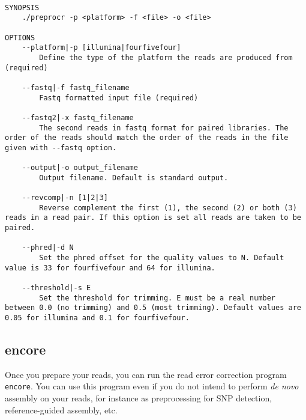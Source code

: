 \documentclass[12pt,a4paper]{report}
\begin{document}
\begin{lstlisting}

SYNOPSIS
    ./preprocr -p <platform> -f <file> -o <file> 

OPTIONS 
    --platform|-p [illumina|fourfivefour] 
        Define the type of the platform the reads are produced from (required) 

    --fastq|-f fastq_filename 
        Fastq formatted input file (required) 

    --fastq2|-x fastq_filename 
        The second reads in fastq format for paired libraries. The order of the reads should match the order of the reads in the file given with --fastq option. 

    --output|-o output_filename 
        Output filename. Default is standard output. 

    --revcomp|-n [1|2|3] 
        Reverse complement the first (1), the second (2) or both (3) reads in a read pair. If this option is set all reads are taken to be paired. 

    --phred|-d N 
        Set the phred offset for the quality values to N. Default value is 33 for fourfivefour and 64 for illumina. 

    --threshold|-s E 
        Set the threshold for trimming. E must be a real number between 0.0 (no trimming) and 0.5 (most trimming). Default values are 0.05 for illumina and 0.1 for fourfivefour. 

\end{lstlisting}

\subsection{encore}

Once you prepare your reads, you can run the read error correction program \texttt{encore}. You can use this program even if you do not intend to perform \emph{de novo} assembly on your reads, for instance as preprocessing for SNP detection, reference-guided assembly, etc.
\end{document}

